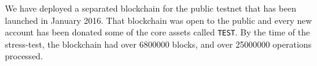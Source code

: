 We have deployed a separated blockchain for the public testnet that has been
launched in January 2016. That blockchain was open to the public and every new
account has been donated some of the core assets called \texttt{TEST}. By the
time of the stress-test, the blockchain had over \num{6800000} blocks,
and over \num{25000000} operations processed.

